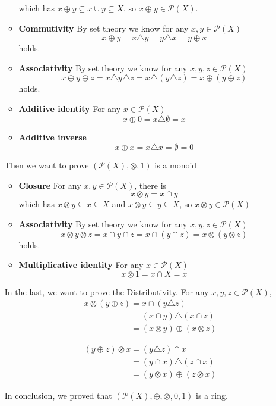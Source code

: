 \documentclass[11pt]{article}
\begin{document}
\begin{enumerate}
\begin{itemize}
				which has $x \oplus y \subseteq x \cup y \subseteq X$, so $x \oplus y \in \mathcal{P}(X)$.
				
				\item \textbf{Commutivity}
					By set theory we know for any $x, y \in \mathcal{P}(X)$
					\[x \oplus y = x \triangle y = y \triangle x = y \oplus x\]
					holds.
				\item \textbf{Associativity}
					By set theory we know for any $x, y, z \in \mathcal{P}(X)$
					\[x \oplus y \oplus z = x \triangle y \triangle z = x \triangle (y \triangle z) = x \oplus (y \oplus z)\]
					holds.
				\item \textbf{Additive identity}
					For any $x \in \mathcal{P}(X)$
					\[x \oplus 0 = x \triangle \emptyset = x\]
				
				\item \textbf{Additive inverse}
					\[x \oplus x = x \triangle x = \emptyset = 0\]
			\end{itemize}
		
		Then we want to prove $(\mathcal{P}(X), \otimes, 1)$ is a monoid
			\begin{itemize}
				\item \textbf{Closure}
				For any $x, y \in \mathcal{P}(X)$, there is 
				\[x \otimes y = x \cap y\]
				which has $x \otimes y \subseteq x \subseteq X$ and $x \otimes y \subseteq y \subseteq X$, so $x \otimes y \in \mathcal{P}(X)$
				
				\item \textbf{Associativity}
				By set theory we know for any $x, y, z \in \mathcal{P}(X)$
					\[x \otimes y \otimes z = x \cap y \cap z = x \cap (y \cap z) = x \otimes (y \otimes z)\]
					holds.
				\item \textbf{Multiplicative identity}
				For any $x \in \mathcal{P}(X)$
				\[x \otimes 1 = x \cap X = x\]
			\end{itemize}
			
		In the last, we want to prove the Distributivity.
		For any $x, y, z \in \mathcal{P}(X)$, 
		\begin{align}
			&x \otimes (y \oplus z) = x \cap (y \triangle z)\nonumber\\
			&\phantom{x \otimes (y \oplus z)} = (x \cap y) \triangle (x \cap z)\nonumber\\
			&\phantom{x \otimes (y \oplus z)} = (x \otimes y) \oplus (x \otimes z)\nonumber
		\end{align}
		
		\begin{align}
			&(y \oplus z) \otimes x = (y \triangle z) \cap x\nonumber\\
			&\phantom{x \otimes (y \oplus z)} = (y \cap x) \triangle (z \cap x)\nonumber\\
			&\phantom{x \otimes (y \oplus z)} = (y \otimes x) \oplus (z \otimes x)\nonumber
		\end{align}
		
		In conclusion, we proved that $(\mathcal{P}(X), \oplus, \otimes, 0, 1)$ is a ring.
	\end{enumerate}
\end{document}
